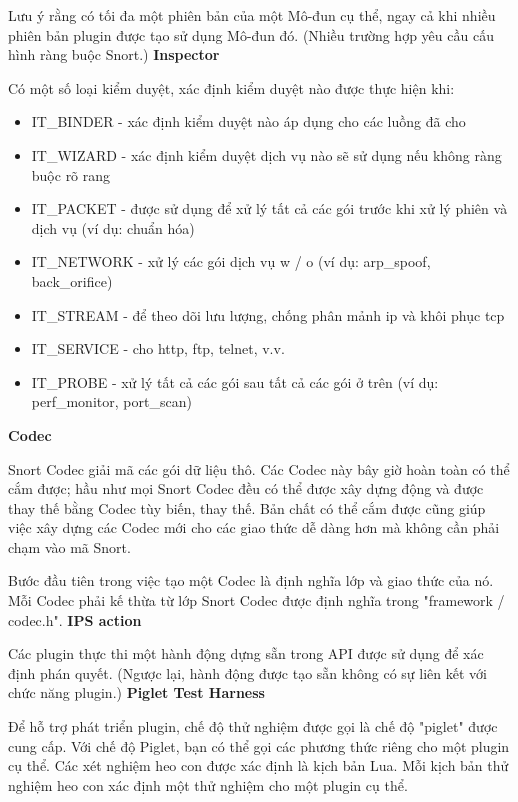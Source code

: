 \par
Lưu ý rằng có tối đa một phiên bản của một Mô-đun cụ thể, ngay cả khi nhiều phiên bản plugin được tạo sử dụng Mô-đun đó. (Nhiều trường hợp yêu cầu cấu hình ràng buộc Snort.)
\newline
\newline
\textbf{Inspector}
\par
Có một số loại kiểm duyệt, xác định kiểm duyệt nào được thực hiện khi:
\begin{itemize}
\item IT\_BINDER - xác định kiểm duyệt nào áp dụng cho các luồng đã cho
\item IT\_WIZARD - xác định kiểm duyệt dịch vụ nào sẽ sử dụng nếu không ràng buộc rõ rang
\item IT\_PACKET - được sử dụng để xử lý tất cả các gói trước khi xử lý phiên và dịch vụ (ví dụ: chuẩn hóa)
\item IT\_NETWORK - xử lý các gói dịch vụ w / o (ví dụ: arp\_spoof, back\_orifice)
\item IT\_STREAM - để theo dõi lưu lượng, chống phân mảnh ip và khôi phục tcp
\item IT\_SERVICE - cho http, ftp, telnet, v.v.
\item IT\_PROBE - xử lý tất cả các gói sau tất cả các gói ở trên (ví dụ: perf\_monitor, port\_scan)
\end{itemize}
\textbf{Codec}
\par
Snort Codec giải mã các gói dữ liệu thô. Các Codec này bây giờ hoàn toàn có thể cắm được; hầu như mọi Snort Codec đều có thể được xây dựng động và được thay thế bằng Codec tùy biến, thay thế. Bản chất có thể cắm được cũng giúp việc xây dựng các Codec mới cho các giao thức dễ dàng hơn mà không cần phải chạm vào mã Snort.
\par
Bước đầu tiên trong việc tạo một Codec là định nghĩa lớp và giao thức của nó. Mỗi Codec phải kế thừa từ lớp Snort Codec được định nghĩa trong "framework / codec.h".
\newline
\newline
\textbf{IPS action}
\par
Các plugin thực thi một hành động dựng sẵn trong API được sử dụng để xác định phán quyết. (Ngược lại, hành động được tạo sẵn không có sự liên kết với chức năng plugin.)
\newline
\newline
\textbf{Piglet Test Harness}
\par
Để hỗ trợ phát triển plugin, chế độ thử nghiệm được gọi là chế độ "piglet" được cung cấp. 
Với chế độ Piglet, bạn có thể gọi các phương thức riêng cho một plugin cụ thể. 
Các xét nghiệm heo con được xác định là kịch bản Lua. 
Mỗi kịch bản thử nghiệm heo con xác định một thử nghiệm cho một plugin cụ thể.